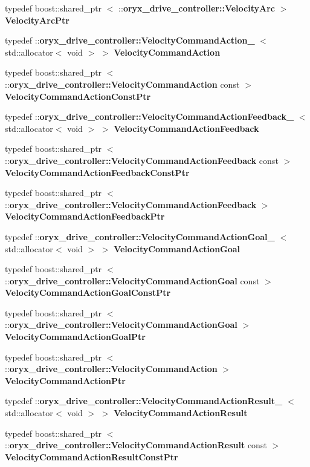 \begin{DoxyCompactItemize}
typedef boost\-::shared\-\_\-ptr\*
$<$ \-::{\bf oryx\-\_\-drive\-\_\-controller\-::\-Velocity\-Arc} $>$ {\bf \-Velocity\-Arc\-Ptr}
\item 
typedef \*
\-::{\bf oryx\-\_\-drive\-\_\-controller\-::\-Velocity\-Command\-Action\-\_\-}\*
$<$ std\-::allocator$<$ void $>$ $>$ {\bf \-Velocity\-Command\-Action}
\item 
typedef boost\-::shared\-\_\-ptr\*
$<$ \-::{\bf oryx\-\_\-drive\-\_\-controller\-::\-Velocity\-Command\-Action} \*
const  $>$ {\bf \-Velocity\-Command\-Action\-Const\-Ptr}
\item 
typedef \*
\-::{\bf oryx\-\_\-drive\-\_\-controller\-::\-Velocity\-Command\-Action\-Feedback\-\_\-}\*
$<$ std\-::allocator$<$ void $>$ $>$ {\bf \-Velocity\-Command\-Action\-Feedback}
\item 
typedef boost\-::shared\-\_\-ptr\*
$<$ \-::{\bf oryx\-\_\-drive\-\_\-controller\-::\-Velocity\-Command\-Action\-Feedback} \*
const  $>$ {\bf \-Velocity\-Command\-Action\-Feedback\-Const\-Ptr}
\item 
typedef boost\-::shared\-\_\-ptr\*
$<$ \-::{\bf oryx\-\_\-drive\-\_\-controller\-::\-Velocity\-Command\-Action\-Feedback} $>$ {\bf \-Velocity\-Command\-Action\-Feedback\-Ptr}
\item 
typedef \*
\-::{\bf oryx\-\_\-drive\-\_\-controller\-::\-Velocity\-Command\-Action\-Goal\-\_\-}\*
$<$ std\-::allocator$<$ void $>$ $>$ {\bf \-Velocity\-Command\-Action\-Goal}
\item 
typedef boost\-::shared\-\_\-ptr\*
$<$ \-::{\bf oryx\-\_\-drive\-\_\-controller\-::\-Velocity\-Command\-Action\-Goal} \*
const  $>$ {\bf \-Velocity\-Command\-Action\-Goal\-Const\-Ptr}
\item 
typedef boost\-::shared\-\_\-ptr\*
$<$ \-::{\bf oryx\-\_\-drive\-\_\-controller\-::\-Velocity\-Command\-Action\-Goal} $>$ {\bf \-Velocity\-Command\-Action\-Goal\-Ptr}
\item 
typedef boost\-::shared\-\_\-ptr\*
$<$ \-::{\bf oryx\-\_\-drive\-\_\-controller\-::\-Velocity\-Command\-Action} $>$ {\bf \-Velocity\-Command\-Action\-Ptr}
\item 
typedef \*
\-::{\bf oryx\-\_\-drive\-\_\-controller\-::\-Velocity\-Command\-Action\-Result\-\_\-}\*
$<$ std\-::allocator$<$ void $>$ $>$ {\bf \-Velocity\-Command\-Action\-Result}
\item 
typedef boost\-::shared\-\_\-ptr\*
$<$ \-::{\bf oryx\-\_\-drive\-\_\-controller\-::\-Velocity\-Command\-Action\-Result} \*
const  $>$ {\bf \-Velocity\-Command\-Action\-Result\-Const\-Ptr}
\item 

\end{DoxyCompactItemize}

